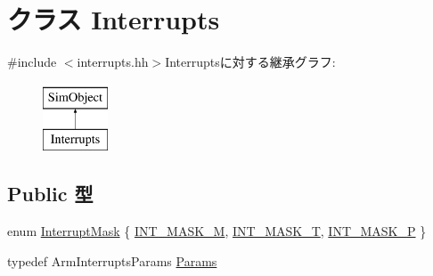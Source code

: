 \hypertarget{classArmISA_1_1Interrupts}{
\section{クラス Interrupts}
\label{classArmISA_1_1Interrupts}
}


{\ttfamily \#include $<$interrupts.hh$>$}Interruptsに対する継承グラフ:\begin{figure}[H]
\begin{center}
\leavevmode
\includegraphics[height=2cm]{classArmISA_1_1Interrupts}
\end{center}
\end{figure}
\subsection*{Public 型}
\begin{DoxyCompactItemize}
\item 
enum \hyperlink{classArmISA_1_1Interrupts_a97c4397dfb2beed097fea7fe60ef17d8}{InterruptMask} \{ \hyperlink{classArmISA_1_1Interrupts_a97c4397dfb2beed097fea7fe60ef17d8a9684cb72d9e92c47ef9b68789b11e9bc}{INT\_\-MASK\_\-M}, 
\hyperlink{classArmISA_1_1Interrupts_a97c4397dfb2beed097fea7fe60ef17d8a77a18b2a95141b2ca0f2af97528e8d56}{INT\_\-MASK\_\-T}, 
\hyperlink{classArmISA_1_1Interrupts_a97c4397dfb2beed097fea7fe60ef17d8a82af2120869ac7674b48b9439b924bf8}{INT\_\-MASK\_\-P}
 \}
\item 
typedef ArmInterruptsParams \hyperlink{classArmISA_1_1Interrupts_a747dfcc35968d9e2b82998fae6408d6a}{Params}
\end{DoxyCompactItemize}
